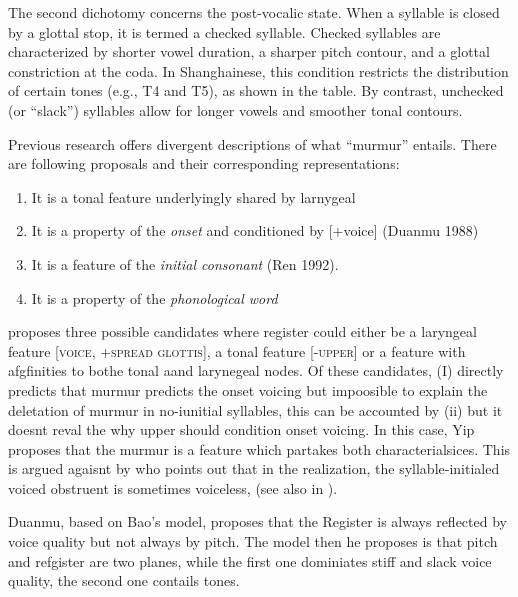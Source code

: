 \documentclass[11pt]{article}
\begin{document}
The second dichotomy concerns the post-vocalic state. When a syllable is closed by a glottal stop, it is termed a checked syllable. Checked syllables are characterized by shorter vowel duration, a sharper pitch contour, and a glottal constriction at the coda. In Shanghainese, this condition restricts the distribution of certain tones (e.g., T4 and T5), as shown in the table. By contrast, unchecked (or “slack”) syllables allow for longer vowels and smoother tonal contours.



Previous research offers divergent descriptions of what ``murmur'' entails. There are following proposals and their corresponding representations:
\begin{enumerate}
    \item It is a tonal feature underlyingly shared by larnygeal \citep{yip1993tonal}
    \item It is a property of the \textit{onset} and conditioned by [+voice] (Duanmu 1988)
    \item It is a feature of the \textit{initial consonant} (Ren 1992).  
    \item It is a property of the \textit{phonological word} \citep{zhu1999shanghai}
\end{enumerate}


\citep{yipsniderPhonologyTone1993} proposes three possible candidates where register could either be a laryngeal feature \textsc{[voice, +spread glottis]}, a tonal feature \textsc{[-upper]} or a feature with afgfinities to bothe tonal aand larynegeal nodes. Of these candidates, (I) directly predicts that murmur predicts the onset voicing but impoosible to explain the deletation of murmur in no-iunitial syllables, this can be accounted by (ii) but it doesnt reval the why upper should condition onset voicing. In this case, Yip proposes that the murmur is a feature which partakes both characterialsices. This is argued agaisnt by \citep{zhu1999shanghai} who points out that in the realization, the syllable-initialed voiced obstruent is sometimes voiceless, (see also in \citep{chen2015shanghai}).


Duanmu, based on Bao's model, proposes that the Register is always reflected by voice quality but not always by pitch. The model then he proposes is that pitch and refgister are two planes, while the first one dominiates stiff and slack voice quality, the second one contails tones. 
\end{document}
